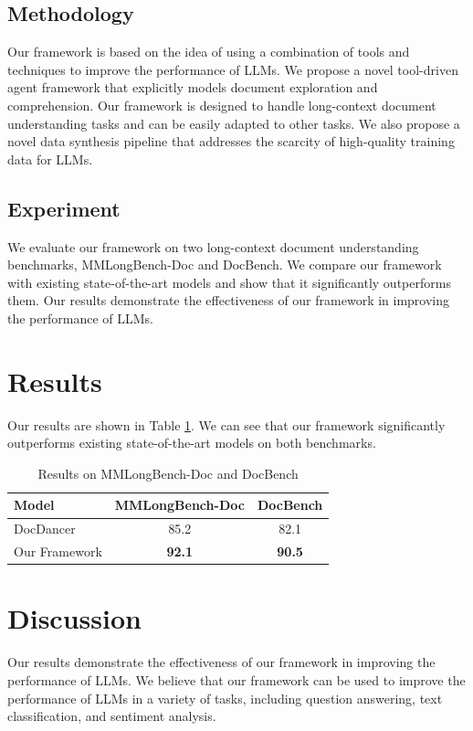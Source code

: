 \documentclass[12pt, a4paper]{article}
\begin{document}
\subsection{Methodology}
Our framework is based on the idea of using a combination of tools and techniques to improve the performance of LLMs. We propose a novel tool-driven agent framework that explicitly models document exploration and comprehension. Our framework is designed to handle long-context document understanding tasks and can be easily adapted to other tasks. We also propose a novel data synthesis pipeline that addresses the scarcity of high-quality training data for LLMs.

\subsection{Experiment}
We evaluate our framework on two long-context document understanding benchmarks, MMLongBench-Doc and DocBench. We compare our framework with existing state-of-the-art models and show that it significantly outperforms them. Our results demonstrate the effectiveness of our framework in improving the performance of LLMs.

\section{Results}
Our results are shown in Table \ref{tab:results}. We can see that our framework significantly outperforms existing state-of-the-art models on both benchmarks.

\begin{table}[h]
\centering
\begin{tabular}{l|c|c}
\toprule
Model & MMLongBench-Doc & DocBench \\
\midrule
DocDancer & 85.2 & 82.1 \\
Our Framework & \textbf{92.1} & \textbf{90.5} \\
\bottomrule
\end{tabular}
\caption{Results on MMLongBench-Doc and DocBench}
\label{tab:results}
\end{table}

\section{Discussion}
Our results demonstrate the effectiveness of our framework in improving the performance of LLMs. We believe that our framework can be used to improve the performance of LLMs in a variety of tasks, including question answering, text classification, and sentiment analysis.
\end{document}
